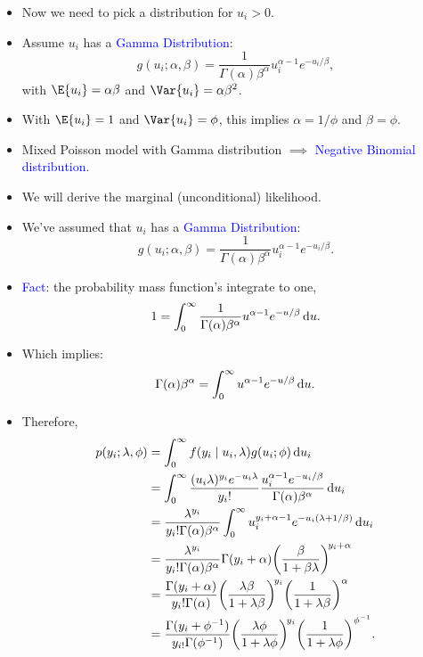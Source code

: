 \documentclass[oneside]{book}\usepackage[]{graphicx}\usepackage[svgnames]{xcolor}
\begin{document}
\begin{itemize}
      \item Now we need to pick a distribution for $ u_i>0 $.
      \item Assume $ u_i $ has a \textcolor{Blue}{Gamma Distribution}:
            \[ g(u_i;\alpha,\beta)=\frac{1}{\Gamma(\alpha)\beta^\alpha}u_i^{\alpha-1}e^{-u_i/\beta}, \]
            with $ \E{u_i}=\alpha\beta $ and $ \Var{u_i}=\alpha\beta^2 $.
      \item With $ \E{u_i}=1 $ and $ \Var{u_i}=\phi $, this implies $ \alpha=1/\phi $ and $ \beta=\phi $.
      \item Mixed Poisson model with Gamma distribution $ \implies $ \textcolor{Blue}{Negative Binomial distribution}.
      \item We will derive the marginal (unconditional) likelihood.
      \item We've assumed that $ u_i $ has a \textcolor{Blue}{Gamma Distribution}:
            \[ g(u_i;\alpha,\beta)=\frac{1}{\Gamma(\alpha)\beta^\alpha}u_i^{\alpha-1}e^{-u_i/\beta}. \]
      \item \textcolor{Blue}{Fact}: the probability mass function's integrate to one,
            \[ 1=\int_{0}^{\infty}\frac{1}{\Gamma(\alpha)\beta^\alpha}u^{\alpha-1}e^{-u/\beta}\odif{u}. \]
      \item Which implies:
            \[ \Gamma(\alpha)\beta^\alpha=\int_{0}^{\infty}u^{\alpha-1}e^{-u/\beta}\odif{u}. \]
      \item Therefore,
            \begin{align*}
                  p(y_i;\lambda,\phi)
                   & =\int_{0}^{\infty} f(y_i\mid u_i,\lambda) g(u_i; \phi) \odif{u_i}                                                                                                     \\
                   & =\int_{0}^{\infty} \frac{(u_i \lambda)^{y_i} e^{-u_i \lambda}}{y_i!}\frac{u_i^{\alpha-1} e^{-u_i / \beta}}{\Gamma(\alpha) \beta^{\alpha}} \odif{u_i}                  \\
                   & =\frac{\lambda^{y_i}}{y_i ! \Gamma(\alpha) \beta^{\alpha}} \int_{0}^{\infty} u_i^{y_i+\alpha-1} e^{-u_i(\lambda+1 / \beta)} \odif{u_i}                                \\
                   & =\frac{\lambda^{y_i}}{y_i ! \Gamma(\alpha) \beta^{\alpha}} \Gamma(y_i+\alpha)\biggl(\frac{\beta}{1+\beta \lambda}\biggr)^{\! y_i+\alpha}                              \\
                   & =\frac{\Gamma(y_i+\alpha)}{y_i ! \Gamma(\alpha)}\biggl(\frac{\lambda \beta}{1+\lambda \beta}\biggr)^{\!y_i}\biggl(\frac{1}{1+\lambda \beta}\biggr)^{\alpha}           \\
                   & =\frac{\Gamma(y_i+\phi^{-1})}{y_{i !} \Gamma(\phi^{-1})}\biggl(\frac{\lambda \phi}{1+\lambda \phi}\biggr)^{\! y_i}\biggl(\frac{1}{1+\lambda \phi}\biggr)^{\phi^{-1}}.
            \end{align*}
\end{itemize}
\end{document}
